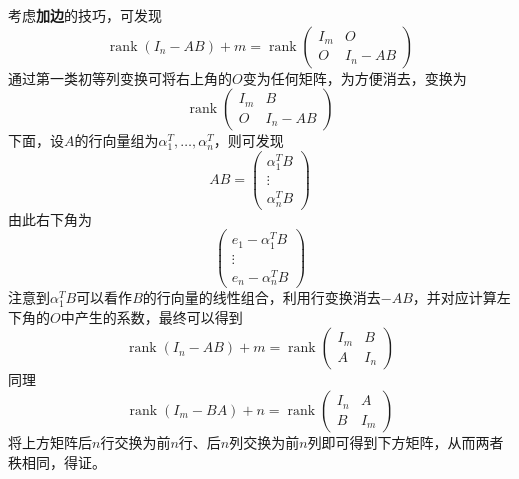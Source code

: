 \documentclass[a4paper,UTF8,fontset=windows]{ctexart}
\DeclareMathOperator{\rank}{rank}
\begin{document}
\begin{enumerate}
    考虑\textbf{加边}的技巧，可发现
    $$\rank(I_n-AB)+m=\rank\begin{pmatrix}I_m&O\\O&I_n-AB\end{pmatrix}$$
    通过第一类初等列变换可将右上角的$O$变为任何矩阵，为方便消去，变换为
    $$\rank\begin{pmatrix}I_m&B\\O&I_n-AB\end{pmatrix}$$
    下面，设$A$的行向量组为$\alpha_1^T,\dots,\alpha_n^T$，则可发现
    $$AB=\begin{pmatrix}\alpha_1^TB\\\vdots\\\alpha_n^TB\end{pmatrix}$$
    由此右下角为
    $$\begin{pmatrix}e_1-\alpha_1^TB\\\vdots\\e_n-\alpha_n^TB\end{pmatrix}$$
    注意到$\alpha_1^TB$可以看作$B$的行向量的线性组合，利用行变换消去$-AB$，并对应计算左下角的$O$中产生的系数，最终可以得到
    $$\rank(I_n-AB)+m=\rank\begin{pmatrix}I_m&B\\A&I_n\end{pmatrix}$$
    同理
    $$\rank(I_m-BA)+n=\rank\begin{pmatrix}I_n&A\\B&I_m\end{pmatrix}$$
    将上方矩阵后$n$行交换为前$n$行、后$n$列交换为前$n$列即可得到下方矩阵，从而两者秩相同，得证。


\end{enumerate}
\end{document}
